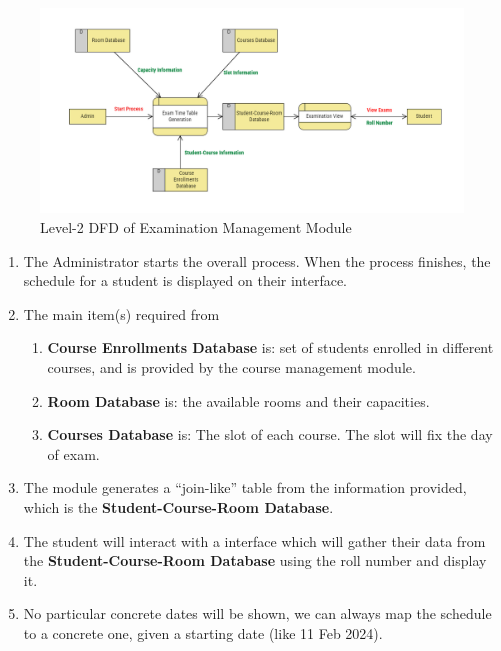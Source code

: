 \documentclass[12pt,a4paper]{article}
\begin{document}
\begin{figure}[H]
    \centering
        \includegraphics[width=\linewidth]{ExamManagement_Level2_DFD.png} 
    \caption{Level-2 DFD of Examination Management Module}
\end{figure}
\begin{enumerate}
    \item The Administrator starts the overall process. When the process finishes, the schedule for a student is displayed on their interface.
    \item The main item(s) required from 
        \begin{enumerate}
            \item \textbf{Course Enrollments Database} is: set of students enrolled in different courses, and is provided by the course management module.
            \item \textbf{Room Database} is: the available rooms and their capacities.
            \item \textbf{Courses Database} is: The slot of each course. The slot will fix the day of exam.
        \end{enumerate}
    \item The module generates a ``join-like'' table from the information provided, which is the \textbf{Student-Course-Room Database}.
    \item The student will interact with a interface which will gather their data from the \textbf{Student-Course-Room Database} using the roll number and display it.
    \item No particular concrete dates will be shown, we can always map the schedule to a concrete one, given a starting date (like 11 Feb 2024).
\end{enumerate}
\end{document}
